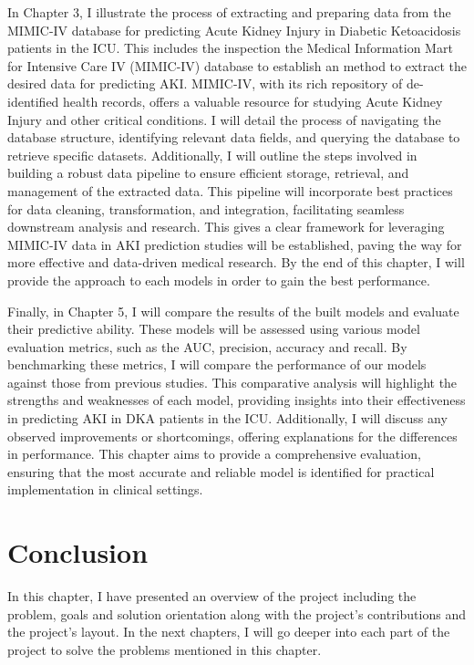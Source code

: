 \documentclass[../main.tex]{subfiles}
\begin{document}
In Chapter 3, I illustrate the process of extracting and preparing data from the \gls{MIMIC-IV} database for predicting Acute Kidney Injury in Diabetic Ketoacidosis patients in the ICU.
This includes the inspection the Medical Information Mart for Intensive Care IV (MIMIC-IV) database to establish an method to extract the desired data for predicting AKI. 
MIMIC-IV, with its rich repository of de-identified health records, offers a valuable resource for studying Acute Kidney Injury and other critical conditions. 
I will detail the process of navigating the database structure, identifying relevant data fields, and querying the database to retrieve specific datasets. 
Additionally, I will outline the steps involved in building a robust data pipeline to ensure efficient storage, retrieval, and management of the extracted data. 
This pipeline will incorporate best practices for data cleaning, transformation, and integration, facilitating seamless downstream analysis and research. 
This gives a clear framework for leveraging \gls{MIMIC-IV} data in \gls{AKI} prediction studies will be established, paving the way for more effective and data-driven medical research.
By the end of this chapter, I will provide the approach to each models in order to gain the best performance.

Finally, in Chapter 5, I will compare the results of the built models and evaluate their predictive ability. 
These models will be assessed using various model evaluation metrics, such as the \gls{AUC}, precision, accuracy and recall. 
By benchmarking these metrics, I will compare the performance of our models against those from previous studies. 
This comparative analysis will highlight the strengths and weaknesses of each model, providing insights into their effectiveness in predicting \gls{AKI} in \gls{DKA} patients in the ICU. 
Additionally, I will discuss any observed improvements or shortcomings, offering explanations for the differences in performance. 
This chapter aims to provide a comprehensive evaluation, ensuring that the most accurate and reliable model is identified for practical implementation in clinical settings.


\section{Conclusion}
In this chapter, I have presented an overview of the project including the problem, goals and solution orientation along with the project's contributions and the project's layout.
In the next chapters, I will go deeper into each part of the project to solve the problems mentioned in this chapter.
\end{document}
